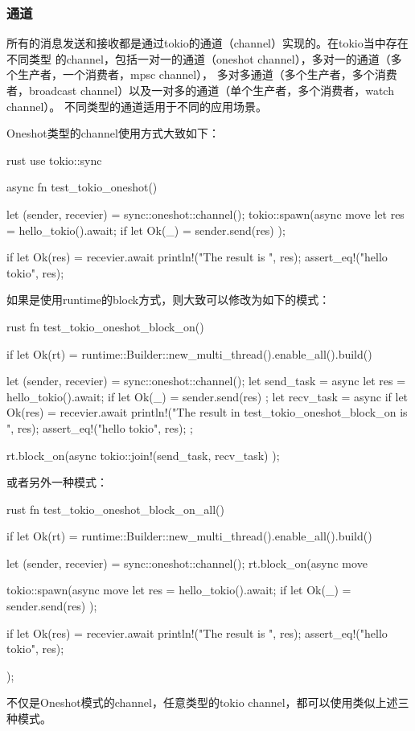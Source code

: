 \subsubsection{通道}
所有的消息发送和接收都是通过tokio的通道（channel）实现的。在tokio当中存在不同类型
的channel，包括一对一的通道（oneshot channel），多对一的通道（多个生产者，一个消费者，mpsc channel），
多对多通道（多个生产者，多个消费者，broadcast channel）以及一对多的通道（单个生产者，多个消费者，watch channel）。
不同类型的通道适用于不同的应用场景。

Oneshot类型的channel使用方式大致如下：
\begin{code-block}{rust}
use tokio::sync

async fn test_tokio_oneshot() {
    let (sender, recevier) = sync::oneshot::channel();
    tokio::spawn(async move {
        let res = hello_tokio().await;
        if let Ok(_) = sender.send(res) {}
    });

    if let Ok(res) = recevier.await {
        println!("The result is {}", res);
        assert_eq!("hello tokio", res);
    }
}
\end{code-block}

如果是使用runtime的block方式，则大致可以修改为如下的模式：
\begin{code-block}{rust}
fn test_tokio_oneshot_block_on() {
    if let Ok(rt) = runtime::Builder::new_multi_thread().enable_all().build() {
        let (sender, recevier) = sync::oneshot::channel();
        let send_task = async {
            let res = hello_tokio().await;
            if let Ok(_) = sender.send(res) {}
        };
        let recv_task = async {
            if let Ok(res) = recevier.await {
                println!("The result in test_tokio_oneshot_block_on is {}", res);
                assert_eq!("hello tokio", res);
            }
        };

        rt.block_on(async { tokio::join!(send_task, recv_task) });
    }
}
\end{code-block}
或者另外一种模式：
\begin{code-block}{rust}
fn test_tokio_oneshot_block_on_all() {
    if let Ok(rt) = runtime::Builder::new_multi_thread().enable_all().build() {
        let (sender, recevier) = sync::oneshot::channel();
        rt.block_on(async move {
            tokio::spawn(async move {
                let res = hello_tokio().await;
                if let Ok(_) = sender.send(res) {}
            });

            if let Ok(res) = recevier.await {
                println!("The result is {}", res);
                assert_eq!("hello tokio", res);
            }
        });
    }
}
\end{code-block}
不仅是Oneshot模式的channel，任意类型的tokio channel，都可以使用类似上述三种模式。

